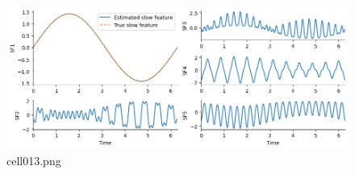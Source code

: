 \begin{figure}[ht]
	\centering
	\includegraphics[scale=0.8, max width=\linewidth]{./fig/local-learning-rule/slow-feature-analysis/cell013.png}
	\caption{cell013.png}
	\label{cell013.png}
\end{figure}